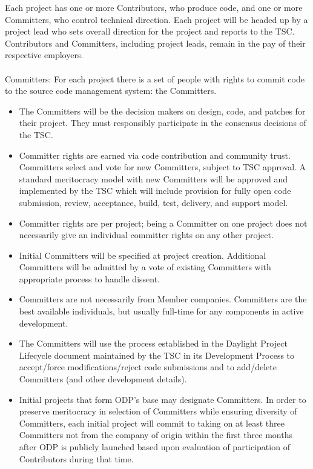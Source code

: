 \documentclass[a4paper, 12pt]{book}
\begin{document}
{
Each project has one or more Contributors, who produce code, and one or more Committers, who control technical direction.  Each project will be headed up by a project lead who sets overall direction for the project and reports to the TSC.  Contributors and Committers, including project leads, remain in the pay of their respective employers.\\
\\
Committers: For each project there is a set of people with rights to commit code to the source code management system: the Committers.
\begin{itemize}\itemsep0pt
\item{The Committers will be the decision makers on design, code, and patches for their project. They must responsibly participate in the consensus decisions of the TSC.}
\item{Committer rights are earned via code contribution and community trust.   Committers select and vote for new Committers, subject to TSC approval.  A standard meritocracy model with new Committers will be approved and implemented by the TSC which will include provision for fully open code submission, review, acceptance, build, test, delivery, and support model.}
\item{Committer rights are per project; being a Committer on one project does not necessarily give an individual committer rights on any other project.}
\item{Initial Committers will be specified at project creation.  Additional Committers will be admitted by a vote of existing Committers with appropriate process to handle dissent.}
\item{Committers are not necessarily from Member companies.  Committers are the best available individuals, but usually full-time for any components in active development.}
\item{The Committers will use the process established in the Daylight Project Lifecycle document maintained by the TSC in its Development Process to accept/force modifications/reject code submissions and to add/delete Committers (and other development details).}
\item{Initial projects that form ODP’s base may designate Committers.  In order to preserve meritocracy in selection of Committers while ensuring diversity of Committers, each initial project will commit to taking on at least three Committers not from the company of origin within the first three months after ODP is publicly launched based upon evaluation of participation of Contributors during that time.}

\end{itemize}}
\end{document}
